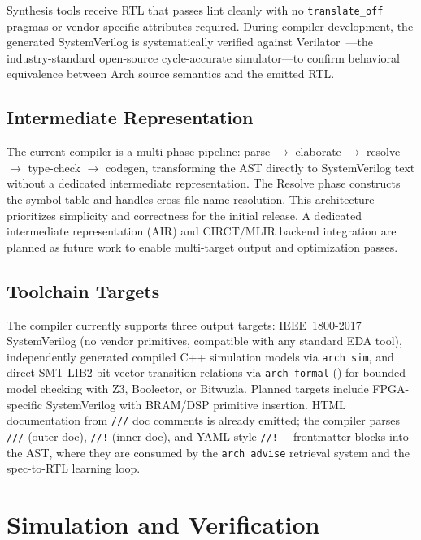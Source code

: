 \documentclass[11pt,twocolumn]{article}
\begin{document}
Synthesis tools receive RTL that passes lint cleanly with no \texttt{translate\_off} pragmas or vendor-specific attributes required. During compiler development, the generated SystemVerilog is systematically verified against Verilator~\cite{verilator}---the industry-standard open-source cycle-accurate simulator---to confirm behavioral equivalence between Arch source semantics and the emitted RTL.

\subsection{Intermediate Representation}

The current compiler is a multi-phase pipeline: parse $\to$ elaborate $\to$ resolve $\to$ type-check $\to$ codegen, transforming the AST directly to SystemVerilog text without a dedicated intermediate representation. The Resolve phase constructs the symbol table and handles cross-file name resolution. This architecture prioritizes simplicity and correctness for the initial release. A dedicated intermediate representation (AIR) and CIRCT/MLIR backend integration are planned as future work to enable multi-target output and optimization passes.

\subsection{Toolchain Targets}

The compiler currently supports three output targets:
IEEE~1800-2017 SystemVerilog (no vendor primitives, compatible with any standard EDA tool),
independently generated compiled C++ simulation models via \texttt{arch sim},
and direct SMT-LIB2 bit-vector transition relations via \texttt{arch formal} () for bounded model checking with Z3, Boolector, or Bitwuzla.
Planned targets include FPGA-specific SystemVerilog with BRAM/DSP primitive insertion. HTML documentation from \texttt{///} doc comments is already emitted; the compiler parses \texttt{///} (outer doc), \texttt{//!} (inner doc), and YAML-style \texttt{//! ---} frontmatter blocks into the AST, where they are consumed by the \texttt{arch advise} retrieval system and the spec-to-RTL learning loop.

\section{Simulation and Verification}\label{sec:sim}
\end{document}
